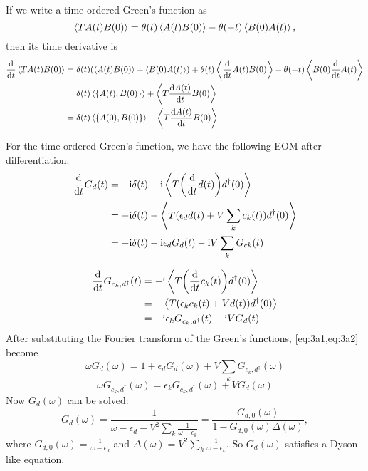 \documentclass{article}
\newcommand{\ii}{\mathrm{i}}
\begin{document}
If we write a time ordered Green's function as
\begin{equation}
    \expval{T A(t)B(0)}=\theta(t)\expval{A(t)B(0)}- \theta(-t)\expval{B(0)A(t)},
\end{equation}
then its time derivative is
\begin{equation}
    \begin{split}
        \dv{t}\expval{T A(t)B(0)}&=\delta(t)\qty(\expval{A(t)B(0)}+\expval{B(0)A(t)})+\theta(t)\expval{\dv{t}A(t)B(0)}-\theta(-t)\expval{B(0)\dv{t}A(t)}\\
                                 &=\delta(t)\expval{\acomm{A(t)}{B(0)}}+\expval{T\dv{A(t)}{t}B(0)}\\
                                 &=\delta(t)\expval{\acomm{A(0)}{B(0)}}+\expval{T\dv{A(t)}{t}B(0)}
    \end{split}
\end{equation}

For the time ordered Green's function, we have the following EOM after differentiation:
\begin{equation}
    \begin{split}\label{eq:3a1}
        \dv{t}G_d(t)&=-\ii\delta(t)-\ii\expval{T \qty(\dv{t}d(t))d^\dagger(0)}\\
                    &=-\ii\delta(t)-\expval{T(\epsilon_d d(t) + V\sum_k c_k(t))d^\dagger(0)}\\
                    &=-\ii\delta(t)-\ii \epsilon_d G_d(t)-\ii V\sum_k G_{ck}(t)
    \end{split}
\end{equation}

\begin{equation}
    \begin{split}\label{eq:3a2}
        \dv{t}G_{c_k,d^\dagger}(t)&=-\ii\expval{T \qty(\dv{t}c_k(t))d^\dagger(0)}\\
                                  &=-\expval{T(\epsilon_k c_k(t) + V d(t))d^\dagger(0)}\\
                                  &=-\ii \epsilon_k G_{c_k,d^\dagger}(t)-\ii V G_d(t)
    \end{split}
\end{equation}
After substituting the Fourier transform of the Green's functions, \cref{eq:3a1,eq:3a2} become
\begin{equation}
    \omega G_d(\omega)=1+\epsilon_d G_d(\omega)+V\sum_k G_{c_k,d^\dagger}(\omega)
\end{equation}
\begin{equation}
    \omega G_{c_k,d^\dagger}(\omega)=\epsilon_k G_{c_k,d^\dagger}(\omega)+V G_d(\omega)
\end{equation}
Now $G_d(\omega)$ can be solved:
\begin{equation}
    G_d(\omega)=\frac{1}{\omega-\epsilon_d-V^2\sum_k \frac{1}{\omega-\epsilon_k}}=\frac{G_{d,0}(\omega)}{1-G_{d,0}(\omega)\Delta(\omega)},
\end{equation}
where $G_{d,0}(\omega)=\frac{1}{\omega-\epsilon_d}$ and $\Delta(\omega)=V^2\sum_k \frac{1}{\omega-\epsilon_k}$.
So $G_d(\omega)$ satisfies a Dyson-like equation.
\end{document}

